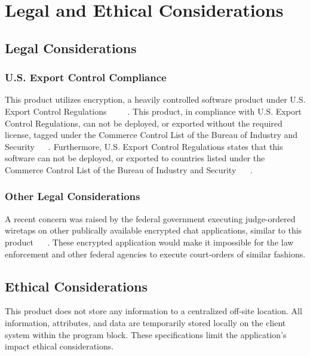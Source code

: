 \documentclass[sigconf]{acmart}
\begin{document}
\section{Legal and Ethical Considerations}
\subsection{Legal Considerations}
\subsubsection{U.S. Export Control Compliance}
This product utilizes encryption, a heavily controlled software product under
U.S. Export Control Regulations ~\cite{GENGLER19995} ~\cite{EAR_TERM}
~\cite{EAR_CAT5}. This product, in compliance with U.S. Export Control
Regulations, can not be deployed, or exported without the required license,
tagged under the Commerce Control List of the Bureau of Industry and Security
~\cite{EAR_TERM} ~\cite{EAR_CAT5}. Furthermore, U.S. Export Control Regulations
states that this software can not be deployed, or exported to countries listed
under the Commerce Control List of the Bureau of Industry and Security
~\cite{EAR_TERM} ~\cite{EAR_CAT5}.
\subsubsection{Other Legal Considerations}
A recent concern was raised by the federal government executing judge-ordered
wiretaps on other publically available encrypted chat applications, similar to
this product ~\cite{EncryptionEthics} ~\cite{WhatsAppWireTap}. These encrypted
application would make it impossible for the law enforcement and other federal
agencies to execute court-orders of similar fashions.

\subsection{Ethical Considerations}
This product does not store any information to a centralized off-site location.
All information, attributes, and data are temporarily stored locally on the
client system within the program block. These specifications limit the
application's impact ethical considerations.

\end{document}
